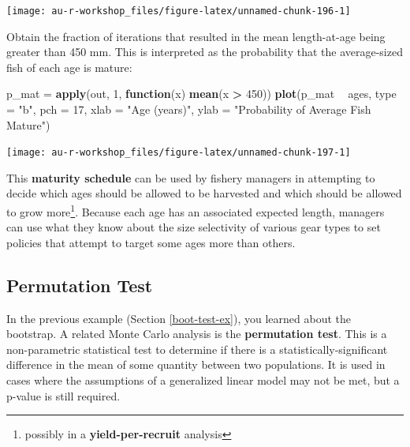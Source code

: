 \documentclass[]{book}
\newenvironment{Shaded}{\begin{snugshade}}{\end{snugshade}}
\newcommand{\KeywordTok}[1]{\textcolor[rgb]{0.13,0.29,0.53}{\textbf{#1}}}
\newcommand{\DataTypeTok}[1]{\textcolor[rgb]{0.13,0.29,0.53}{#1}}
\newcommand{\DecValTok}[1]{\textcolor[rgb]{0.00,0.00,0.81}{#1}}
\newcommand{\StringTok}[1]{\textcolor[rgb]{0.31,0.60,0.02}{#1}}
\newcommand{\ControlFlowTok}[1]{\textcolor[rgb]{0.13,0.29,0.53}{\textbf{#1}}}
\newcommand{\OperatorTok}[1]{\textcolor[rgb]{0.81,0.36,0.00}{\textbf{#1}}}
\newcommand{\NormalTok}[1]{#1}
\let\rmarkdownfootnote\footnote%
\def\footnote{\protect\rmarkdownfootnote}
\theoremstyle{definition}
\theoremstyle{definition}
\theoremstyle{definition}
\theoremstyle{remark}
\begin{document}
\begin{center}\texttt{[image: au-r-workshop\_files/figure-latex/unnamed-chunk-196-1]} \end{center}

Obtain the fraction of iterations that resulted in the mean
length-at-age being greater than 450 mm. This is interpreted as the
probability that the average-sized fish of each age is mature:

\begin{Shaded}
\begin{Highlighting}[]
\NormalTok{p_mat =}\StringTok{ }\KeywordTok{apply}\NormalTok{(out, }\DecValTok{1}\NormalTok{, }\ControlFlowTok{function}\NormalTok{(x) }\KeywordTok{mean}\NormalTok{(x }\OperatorTok{>}\StringTok{ }\DecValTok{450}\NormalTok{))}
\KeywordTok{plot}\NormalTok{(p_mat }\OperatorTok{~}\StringTok{ }\NormalTok{ages, }\DataTypeTok{type =} \StringTok{"b"}\NormalTok{, }\DataTypeTok{pch =} \DecValTok{17}\NormalTok{,}
     \DataTypeTok{xlab =} \StringTok{"Age (years)"}\NormalTok{, }\DataTypeTok{ylab =} \StringTok{"Probability of Average Fish Mature"}\NormalTok{)}
\end{Highlighting}
\end{Shaded}

\begin{center}\texttt{[image: au-r-workshop\_files/figure-latex/unnamed-chunk-197-1]} \end{center}

This \textbf{maturity schedule} can be used by fishery managers in
attempting to decide which ages should be allowed to be harvested and
which should be allowed to grow more\footnote{possibly in a
  \textbf{yield-per-recruit} analysis}. Because each age has an
associated expected length, managers can use what they know about the
size selectivity of various gear types to set policies that attempt to
target some ages more than others.

\subsection{Permutation Test}\label{perm-test-ex}

In the previous example (Section \ref{boot-test-ex}), you learned about
the bootstrap. A related Monte Carlo analysis is the \textbf{permutation
test}. This is a non-parametric statistical test to determine if there
is a statistically-significant difference in the mean of some quantity
between two populations. It is used in cases where the assumptions of a
generalized linear model may not be met, but a p-value is still
required.
\end{document}
